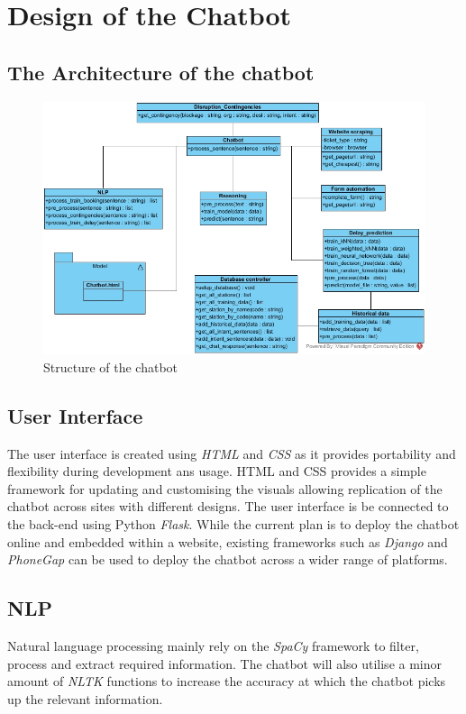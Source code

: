 \documentclass[11pt]{article}
\begin{document}
\section{Design of the Chatbot}

 
\subsection{The Architecture of the chatbot}
\begin{figure}[!htb]
	\centering
	\includegraphics[width=1.0\textwidth]{Chatbot_Structure}
	\caption{Structure of the chatbot }\label{fig:Chatbot_Structure}
\end{figure}
\subsection{User Interface} 
The user interface is created using \textit{HTML} and \textit{CSS} as it provides portability and flexibility during development ans usage. HTML and CSS provides a simple framework for updating and customising the visuals allowing replication of the chatbot across sites with different designs. The user interface is be connected to the back-end using Python \textit{Flask}. While the current plan is to deploy the chatbot online and embedded within a website, existing frameworks such as \textit{Django} and \textit{PhoneGap} can be used to deploy the chatbot across a wider range of platforms.

\subsection{NLP}
Natural language processing mainly rely on the \textit{SpaCy} framework to filter, process and extract required information. The chatbot will also utilise a minor amount of \textit{NLTK} functions to increase the accuracy at which the chatbot picks up the relevant information.
\end{document}
